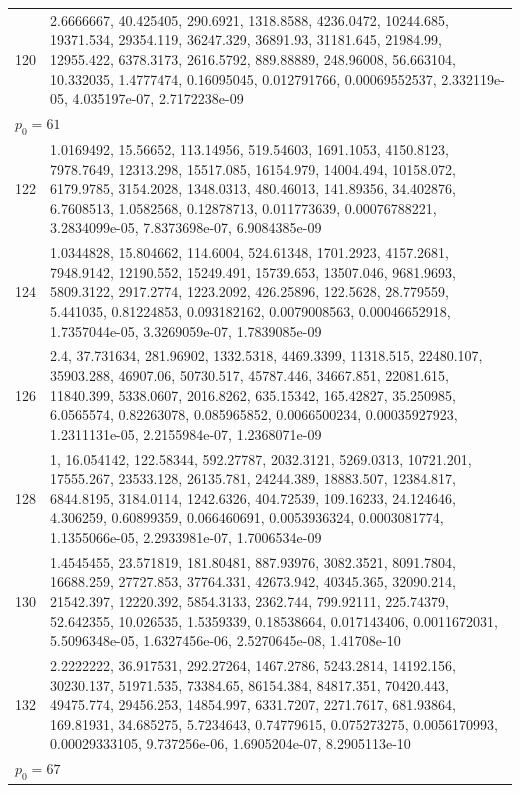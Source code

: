 \documentclass[11pt]{article}
\theoremstyle{definition}
\theoremstyle{remark}
\begin{document}
{\begin{longtable}{r p{}}
120 & 2.6666667, 40.425405, 290.6921, 1318.8588, 4236.0472, 10244.685, 19371.534, 29354.119, 36247.329, 36891.93, 31181.645, 21984.99, 12955.422, 6378.3173, 2616.5792, 889.88889, 248.96008, 56.663104, 10.332035, 1.4777474, 0.16095045, 0.012791766, 0.00069552537, 2.332119e-05, 4.035197e-07, 2.7172238e-09 \\
\multicolumn{2}{l}{$p_0 = 61$} \\
122 & 1.0169492, 15.56652, 113.14956, 519.54603, 1691.1053, 4150.8123, 7978.7649, 12313.298, 15517.085, 16154.979, 14004.494, 10158.072, 6179.9785, 3154.2028, 1348.0313, 480.46013, 141.89356, 34.402876, 6.7608513, 1.0582568, 0.12878713, 0.011773639, 0.00076788221, 3.2834099e-05, 7.8373698e-07, 6.9084385e-09 \\
124 & 1.0344828, 15.804662, 114.6004, 524.61348, 1701.2923, 4157.2681, 7948.9142, 12190.552, 15249.491, 15739.653, 13507.046, 9681.9693, 5809.3122, 2917.2774, 1223.2092, 426.25896, 122.5628, 28.779559, 5.441035, 0.81224853, 0.093182162, 0.0079008563, 0.00046652918, 1.7357044e-05, 3.3269059e-07, 1.7839085e-09 \\
126 & 2.4, 37.731634, 281.96902, 1332.5318, 4469.3399, 11318.515, 22480.107, 35903.288, 46907.06, 50730.517, 45787.446, 34667.851, 22081.615, 11840.399, 5338.0607, 2016.8262, 635.15342, 165.42827, 35.250985, 6.0565574, 0.82263078, 0.085965852, 0.0066500234, 0.00035927923, 1.2311131e-05, 2.2155984e-07, 1.2368071e-09 \\
128 & 1, 16.054142, 122.58344, 592.27787, 2032.3121, 5269.0313, 10721.201, 17555.267, 23533.128, 26135.781, 24244.389, 18883.507, 12384.817, 6844.8195, 3184.0114, 1242.6326, 404.72539, 109.16233, 24.124646, 4.306259, 0.60899359, 0.066460691, 0.0053936324, 0.0003081774, 1.1355066e-05, 2.2933981e-07, 1.7006534e-09 \\
130 & 1.4545455, 23.571819, 181.80481, 887.93976, 3082.3521, 8091.7804, 16688.259, 27727.853, 37764.331, 42673.942, 40345.365, 32090.214, 21542.397, 12220.392, 5854.3133, 2362.744, 799.92111, 225.74379, 52.642355, 10.026535, 1.5359339, 0.18538664, 0.017143406, 0.0011672031, 5.5096348e-05, 1.6327456e-06, 2.5270645e-08, 1.41708e-10 \\
132 & 2.2222222, 36.917531, 292.27264, 1467.2786, 5243.2814, 14192.156, 30230.137, 51971.535, 73384.65, 86154.384, 84817.351, 70420.443, 49475.774, 29456.253, 14854.997, 6331.7207, 2271.7617, 681.93864, 169.81931, 34.685275, 5.7234643, 0.74779615, 0.075273275, 0.0056170993, 0.00029333105, 9.737256e-06, 1.6905204e-07, 8.2905113e-10 \\
\multicolumn{2}{l}{$p_0 = 67$} \\

\end{longtable}}
\end{document}
